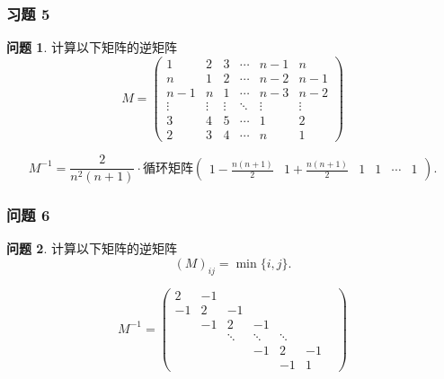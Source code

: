 \documentclass[11pt]{ctexart}
\theoremstyle{definition}
\newtheorem{qqq}{问题}[section]
\numberwithin{equation}{section}
\begin{document}
\subsubsection{习题 5}
\begin{qqq}
    计算以下矩阵的逆矩阵
    \begin{equation}
        M=\begin{pmatrix}
            1&2&3&\cdots&n-1&n\\n&1&2&\cdots&n-2&n-1\\n-1&n&1&\cdots&n-3&n-2\\\vdots&\vdots&\vdots&\ddots&\vdots&\vdots\\3&4&5&\cdots&1&2\\2&3&4&\cdots&n&1
        \end{pmatrix}
    \end{equation}
\end{qqq}
\begin{aaa}
    \[M^{-1}=\frac{2}{n^2(n+1)}\cdot \text{循环矩阵}
    \begin{pmatrix}
        1-\frac{n(n+1)}{2}&1+\frac{n(n+1)}{2}&1&1&\cdots&1
    \end{pmatrix}.\]
\end{aaa}

\subsubsection{问题 6}
\begin{qqq}
    计算以下矩阵的逆矩阵
    \begin{equation}(M)_{ij}=\min \{i,j\}.\end{equation}
\end{qqq}
\begin{aaa}
    \[M^{-1}=\begin{pmatrix}
        2&-1&&&&&\\-1&2&-1&&&&\\&-1&2&-1&&&\\&&\ddots&\ddots&\ddots&\\&&&-1&2&-1\\&&&&-1&1
    \end{pmatrix}\]
\end{aaa}
\end{document}
